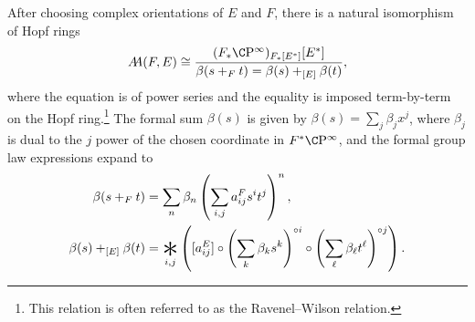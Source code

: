 \begin{lemma}\label{UnstableRWRelation}
After choosing complex orientations of \(E\) and \(F\), there is a natural isomorphism of Hopf rings \[\AA(F, E) \cong \frac{(F_* \CP^\infty)_{F_*[E^*]}[E^*]}{\beta(s +_F t) = \beta(s) +_{[E]} \beta(t)},\] where the equation is of power series and the equality is imposed term-by-term on the Hopf ring.\footnote{This relation is often referred to as the Ravenel--Wilson relation.}  The formal sum \(\beta(s)\) is given by \(\beta(s) = \sum_j \beta_j x^j\), where \(\beta_j\) is dual to the \(j\){\th} power of the chosen coordinate in \(F^* \CP^\infty\), and the formal group law expressions expand to
\begin{align*}
\beta(s +_F t) & = \sum_n \beta_n \left(\sum_{i, j} a_{ij}^F s^i t^j \right)^n, \\
\beta(s) +_{[E]} \beta(t) & = \bigast_{i, j} \left([a_{ij}^E] \circ \left( \sum_k \beta_k s^k \right)^{\circ i} \circ \left( \sum_\ell \beta_\ell t^\ell \right)^{\circ j} \right).
\end{align*}
\end{lemma}
